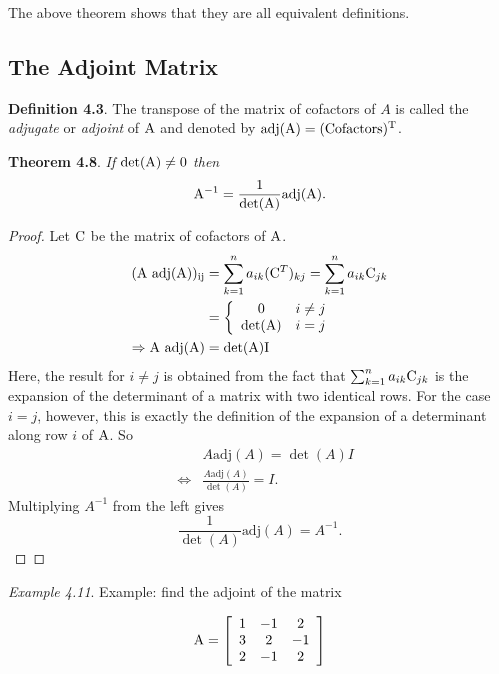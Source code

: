 \documentclass[
  letterpaper,
  DIV=11,
  numbers=noendperiod]{scrartcl}
\theoremstyle{remark}
\begin{document}
The above theorem shows that they are all equivalent definitions.

\subsection{The Adjoint Matrix}\label{the-adjoint-matrix}

\textbf{Definition 4.3}. The transpose of the matrix of cofactors of
\(A\) is called the \emph{adjugate} or \emph{adjoint} of \({\rm A}\) and
denoted by \(\rm{adj}({\rm A}) =(\mbox{Cofactors})^{T}\).

\textbf{Theorem 4.8}. \emph{If \(\det({\rm A}) \neq 0\) then
\[{\rm A}^{-1} =\frac{1}{\det({\rm A})} \rm{adj}({\rm A}).\]}

\begin{proof}
Let \({\rm C}\) be the matrix of cofactors of \({\rm A}\).
\[\begin{aligned}
 ({\rm A} \  \rm{adj}({\rm A}))_{ij} &= \sum_{k=1}^{n} a_{ik} ({\rm C}^{T})_{kj} =  \sum_{k=1}^{n} a_{ik} {\rm C}_{jk} \\
 &= \left\{ 
\begin{array}{cc}
0 & i \neq j \\ 
\det(\rm{A}) & i=j
\end{array}
\right. \\
\Rightarrow {\rm A} \  \rm{adj}({\rm A}) &= \det(\rm{A}) {\rm I} 
\end{aligned}\] Here, the result for \(i\neq j\) is obtained from the
fact that \(\sum_{k=1}^{n} a_{ik} {\rm C}_{jk}\) is the expansion of the
determinant of a matrix with two identical rows. For the case \(i=j\),
however, this is exactly the definition of the expansion of a
determinant along row \(i\) of \({\rm A}\). So \[\begin{aligned}
&& A\textrm{adj}(A)=\det(A)I \\
&\Leftrightarrow& \frac{A \textrm{adj}(A)}{\det(A)}=I.
\end{aligned}\] Multiplying \(A^{-1}\) from the left gives
\[\frac{1}{\det(A)} \textrm{adj}(A)=A^{-1}.\]~◻
\end{proof}

\emph{Example 4.11}. Example: find the adjoint of the matrix

\[{\rm A}=\left[
\begin{array}{ccc}
1 & -1 & 2\\
3 & 2 & -1\\
2 & -1 & 2\\
\end{array}
\right]\]
\end{document}
